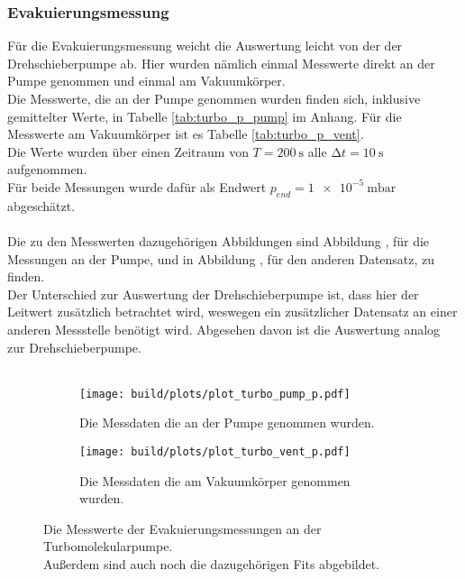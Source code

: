         \subsubsection{Evakuierungsmessung}

        \noindent
        Für die Evakuierungsmessung weicht die Auswertung leicht von der der Drehschieberpumpe ab. 
        Hier wurden nämlich einmal Messwerte direkt an der Pumpe genommen und einmal am Vakuumkörper. \\
        Die Messwerte, die an der Pumpe genommen wurden finden sich, inklusive gemittelter Werte, in Tabelle \ref{tab:turbo_p_pump} im Anhang. 
        Für die Messwerte am Vakuumkörper ist es Tabelle \ref{tab:turbo_p_vent}. \\
        Die Werte wurden über einen Zeitraum von $ T = \SI{200}{\second}$ alle $ \increment t = \SI{10}{\second}$ aufgenommen.\\
        Für beide Messungen wurde dafür als Endwert $p_{end} = \SI{1e-5}{\milli\bar}$ abgeschätzt.\\\\
        Die zu den Messwerten dazugehörigen Abbildungen sind Abbildung , 
        für die Messungen an der Pumpe, und in Abbildung , für den anderen Datensatz, zu finden.\\
        Der Unterschied zur Auswertung der Drehschieberpumpe ist, dass hier der Leitwert zusätzlich betrachtet wird, 
        weswegen ein zusätzlicher Datensatz an einer anderen Messstelle benötigt wird.
        Abgesehen davon ist die Auswertung analog zur Drehschieberpumpe.\\\\
        \begin{figure}[H]
          \begin{subfigure}{0.46\textwidth}
                  \centering
                  \texttt{[image: build/plots/plot\_turbo\_pump\_p.pdf]}
                  \label{img:turbo_pump_p}
                  \caption{Die Messdaten die an der Pumpe genommen wurden.}
          \end{subfigure}
          \hfill
          \begin{subfigure}{0.46\textwidth}
                  \centering
                  \texttt{[image: build/plots/plot\_turbo\_vent\_p.pdf]}
                  \label{img:turbo_vent_p}
                  \caption{Die Messdaten die am Vakuumkörper genommen wurden.}
          \end{subfigure}
          \caption{Die Messwerte der Evakuierungsmessungen an der Turbomolekularpumpe.\\
          Außerdem sind auch noch die dazugehörigen Fits abgebildet. }
      \end{figure}
